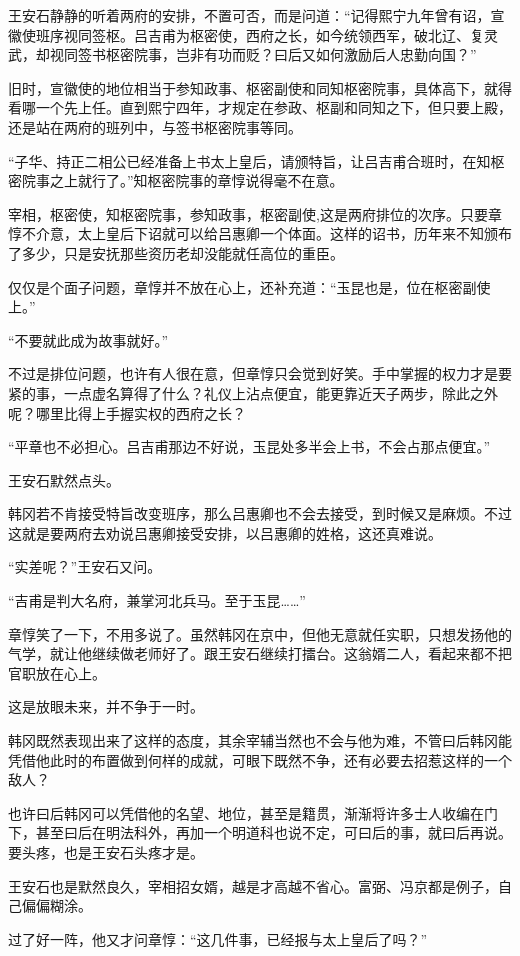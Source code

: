 王安石静静的听着两府的安排，不置可否，而是问道：“记得熙宁九年曾有诏，宣徽使班序视同签枢。吕吉甫为枢密使，西府之长，如今统领西军，破北辽、复灵武，却视同签书枢密院事，岂非有功而贬？曰后又如何激励后人忠勤向国？”

旧时，宣徽使的地位相当于参知政事、枢密副使和同知枢密院事，具体高下，就得看哪一个先上任。直到熙宁四年，才规定在参政、枢副和同知之下，但只要上殿，还是站在两府的班列中，与签书枢密院事等同。

“子华、持正二相公已经准备上书太上皇后，请颁特旨，让吕吉甫合班时，在知枢密院事之上就行了。”知枢密院事的章惇说得毫不在意。

宰相，枢密使，知枢密院事，参知政事，枢密副使,这是两府排位的次序。只要章惇不介意，太上皇后下诏就可以给吕惠卿一个体面。这样的诏书，历年来不知颁布了多少，只是安抚那些资历老却没能就任高位的重臣。

仅仅是个面子问题，章惇并不放在心上，还补充道：“玉昆也是，位在枢密副使上。”

“不要就此成为故事就好。”

不过是排位问题，也许有人很在意，但章惇只会觉到好笑。手中掌握的权力才是要紧的事，一点虚名算得了什么？礼仪上沾点便宜，能更靠近天子两步，除此之外呢？哪里比得上手握实权的西府之长？

“平章也不必担心。吕吉甫那边不好说，玉昆处多半会上书，不会占那点便宜。”

王安石默然点头。

韩冈若不肯接受特旨改变班序，那么吕惠卿也不会去接受，到时候又是麻烦。不过这就是要两府去劝说吕惠卿接受安排，以吕惠卿的姓格，这还真难说。

“实差呢？”王安石又问。

“吉甫是判大名府，兼掌河北兵马。至于玉昆……”

章惇笑了一下，不用多说了。虽然韩冈在京中，但他无意就任实职，只想发扬他的气学，就让他继续做老师好了。跟王安石继续打擂台。这翁婿二人，看起来都不把官职放在心上。

这是放眼未来，并不争于一时。

韩冈既然表现出来了这样的态度，其余宰辅当然也不会与他为难，不管曰后韩冈能凭借他此时的布置做到何样的成就，可眼下既然不争，还有必要去招惹这样的一个敌人？

也许曰后韩冈可以凭借他的名望、地位，甚至是籍贯，渐渐将许多士人收编在门下，甚至曰后在明法科外，再加一个明道科也说不定，可曰后的事，就曰后再说。要头疼，也是王安石头疼才是。

王安石也是默然良久，宰相招女婿，越是才高越不省心。富弼、冯京都是例子，自己偏偏糊涂。

过了好一阵，他又才问章惇：“这几件事，已经报与太上皇后了吗？”

